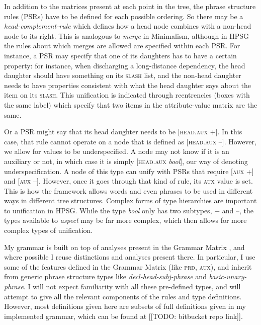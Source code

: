 In addition to the matrices present at each point in the tree, the phrase structure rules (PSRs) have to be defined for each possible ordering. So there may be a \textit{head-complement-rule} which defines how a head node combines with a non-head node to its right. This is analogous to \textit{merge} in Minimalism, although in HPSG the rules about which merges are allowed are specified within each PSR. For instance, a PSR may specify that one of its daughters has to have a certain property: for instance, when discharging a long-distance dependency, the head daughter should have something on its \textsc{slash} list, and the non-head daughter needs to have properties consistent with what the head daughter says about the item on its \textsc{slash}. This unification is indicated through reentrencies (boxes with the same label) which specify that two items in the attribute-value matrix are the same.

Or a PSR might say that its head daughter needs to be [\textsc{head.aux} +]. In this case, that rule cannot operate on a node that is defined as [\textsc{head.aux} --]. However, we allow for values to be underspecified. A node may not know if it is an auxiliary or not, in which case it is simply [\textsc{head.aux} \textit{bool}], our way of denoting underspecification. A node of this type can unify with PSRs that require [\textsc{aux} +] and [\textsc{aux} --]. However, once it goes through that kind of rule, its \textsc{aux} value is set. This is how the framework allows words and even phrases to be used in different ways in different tree structures. Complex forms of type hierarchies are important to unification in HPSG. While the type \textit{bool} only has two subtypes, + and --, the types available to \textit{aspect} may be far more complex, which then allows for more complex types of unification.

My grammar is built on top of analyses present in the Grammar Matrix \citep{bender2002}, and where possible I reuse distinctions and analyses present there. In particular, I use some of the features defined in the Grammar Matrix (like \textsc{prd}, \textsc{aux}), and inherit from generic phrase structure types like \textit{decl-head-subj-phrase} and \textit{basic-unary-phrase}. I will not expect familiarity with all these pre-defined types, and will attempt to give all the relevant components of the rules and type definitions. However, most definitions given here are subsets of full definitions given in my implemented grammar, which can be found at [[TODO: bitbucket repo link]].

